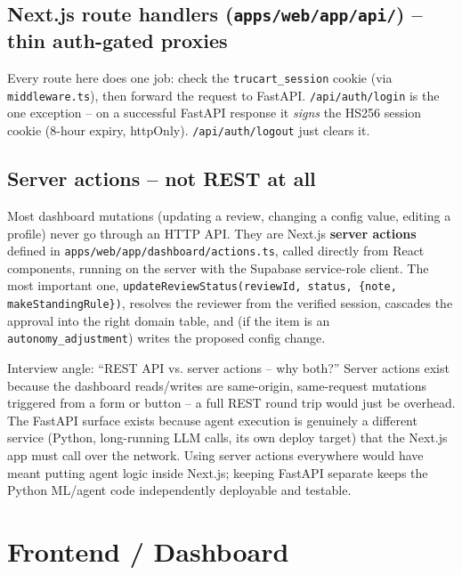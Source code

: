 \documentclass[11pt,a4paper]{article}
\begin{document}
\subsection{Next.js route handlers (\texttt{apps/web/app/api/}) -- thin auth-gated proxies}
Every route here does one job: check the \texttt{trucart\_session} cookie (via
\texttt{middleware.ts}), then forward the request to FastAPI. \texttt{/api/auth/login} is the
one exception -- on a successful FastAPI response it \emph{signs} the HS256 session cookie
(8-hour expiry, httpOnly). \texttt{/api/auth/logout} just clears it.

\subsection{Server actions -- not REST at all}
Most dashboard mutations (updating a review, changing a config value, editing a profile) never
go through an HTTP API. They are Next.js \textbf{server actions} defined in
\texttt{apps/web/app/dashboard/actions.ts}, called directly from React components, running on
the server with the Supabase service-role client. The most important one,
\texttt{updateReviewStatus(reviewId, status, \{note, makeStandingRule\})}, resolves the reviewer
from the verified session, cascades the approval into the right domain table, and (if the item
is an \texttt{autonomy\_adjustment}) writes the proposed config change.

\begin{qabox}{Interview angle: ``REST API vs. server actions -- why both?''}
Server actions exist because the dashboard reads/writes are same-origin, same-request
mutations triggered from a form or button -- a full REST round trip would just be overhead.
The FastAPI surface exists because agent execution is genuinely a different service (Python,
long-running LLM calls, its own deploy target) that the Next.js app must call over the network.
Using server actions everywhere would have meant putting agent logic inside Next.js; keeping
FastAPI separate keeps the Python ML/agent code independently deployable and testable.
\end{qabox}

\section{Frontend / Dashboard}
\end{document}
